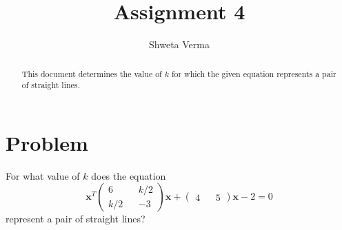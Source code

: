 \documentclass[journal,13pt,twocolumn]{IEEEtran}
\newcommand{\myvec}[1]{\ensuremath{\begin{pmatrix}#1\end{pmatrix}}}
\renewcommand{\vec}[1]{\mathbf{#1}}
\begin{document}
\title{Assignment 4} 
\author{Shweta Verma} 
\maketitle
\newpage
\bigskip
\begin{abstract}
This document determines the value of $k$ for which the given equation represents a pair of straight lines.
\end{abstract}
\section{\textbf{Problem}}
For what value of $k$ does the equation 
\begin{equation} \label{eq:1.1}
\vec{x}^T \myvec{6 && k/2 \\ k/2 && -3} \vec{x} + \myvec{4 && 5}\vec{x} -2 = 0
\end{equation}
represent a pair of straight lines?
\end{document}

